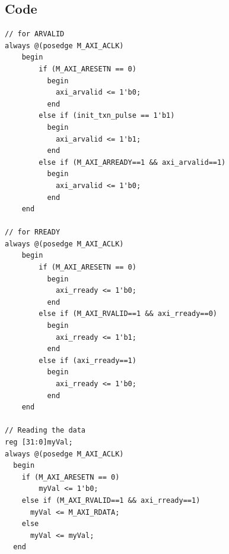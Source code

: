 \documentclass{article}
\begin{document}
\subsection{Code}
\begin{verbatim}
// for ARVALID                                                                
always @(posedge M_AXI_ACLK)                                                     
    begin                                                                            
        if (M_AXI_ARESETN == 0)                                                       
          begin                                                                        
            axi_arvalid <= 1'b0;                                                       
          end     
        else if (init_txn_pulse == 1'b1)                                                    
          begin                                                                        
            axi_arvalid <= 1'b1;                                                       
          end         
        else if (M_AXI_ARREADY==1 && axi_arvalid==1)                                         
          begin                                                                        
            axi_arvalid <= 1'b0;                                                       
          end                                                                            
    end
    
// for RREADY
always @(posedge M_AXI_ACLK)                                    
    begin                                                                 
        if (M_AXI_ARESETN == 0)                                            
          begin                                                             
            axi_rready <= 1'b0;                                             
          end                                         
        else if (M_AXI_RVALID==1 && axi_rready==0)                               
          begin                                                             
            axi_rready <= 1'b1;                                             
          end                                                                
        else if (axi_rready==1)                                                
          begin                                                             
            axi_rready <= 1'b0;                                             
          end                                                               
    end 
    
// Reading the data
reg [31:0]myVal;
always @(posedge M_AXI_ACLK)                                                      
  begin                                                                             
    if (M_AXI_ARESETN == 0)                                                         
        myVal <= 1'b0;                                                     
    else if (M_AXI_RVALID==1 && axi_rready==1)         
      myVal <= M_AXI_RDATA;                                                        
    else                                                                            
      myVal <= myVal;                                               
  end 
\end{verbatim}
\end{document}
